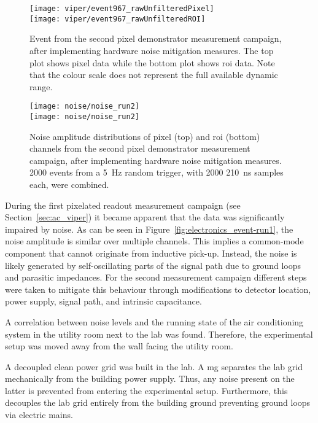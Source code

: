 \begin{figure}[tbp]
	\centering
	\texttt{[image: viper/event967\_rawUnfilteredPixel]}\\
	\texttt{[image: viper/event967\_rawUnfilteredROI]}
	\caption[Event from second pixel demonstrator measurement campaign]{%
		Event from the second pixel demonstrator measurement campaign, after implementing hardware noise mitigation measures.
		The top plot shows pixel data while the bottom plot shows \acrshort{roi} data.
		Note that the colour scale does not represent the full available dynamic range.
	}
	\label{fig:electronics_event-run2}
\end{figure}

\begin{figure}[tbp]
	\centering
	\texttt{[image: noise/noise\_run2]} \\
	\texttt{[image: noise/noise\_run2]}
	\caption[Noise distributions from second pixel demonstrator measurement campaign]{%
		Noise amplitude distributions of pixel (top) and \acrshort{roi} (bottom) channels from the second pixel demonstrator measurement campaign, after implementing hardware noise mitigation measures.
		\num{2000} events from a \SI{5}{\hertz} random trigger, with \num{2000} \SI{210}{\nano\second} samples each, were combined.
	}
	\label{fig:electronics_noise-run2}
\end{figure}

During the first pixelated readout measurement campaign (see Section~\ref{sec:ac_viper}) it became apparent that the data was significantly impaired by noise.
As can be seen in Figure~\ref{fig:electronics_event-run1}, the noise amplitude is similar over multiple channels.
This implies a common-mode component that cannot originate from inductive pick-up.
Instead, the noise is likely generated by self-oscillating parts of the signal path due to ground loops and parasitic impedances.
For the second measurement campaign different steps were taken to mitigate this behaviour through modifications to detector location, power supply, signal path, and intrinsic capacitance.

A correlation between noise levels and the running state of the air conditioning system in the utility room next to the lab was found.
Therefore, the experimental setup was moved away from the wall facing the utility room.

A decoupled clean power grid was built in the lab.
A \gls{mg} separates the lab grid mechanically from the building power supply.
Thus, any noise present on the latter is prevented from entering the experimental setup.
Furthermore, this decouples the lab grid entirely from the building ground preventing ground loops via electric mains.

